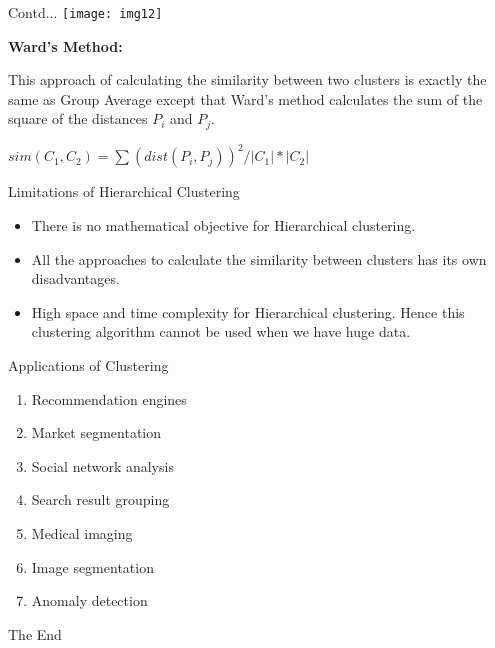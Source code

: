 \documentclass{beamer}
\newcommand\myheading[1]{%
  \par\bigskip
  {\large\bfseries#1}\par\smallskip}
\begin{document}
\begin{frame}{Contd...}
	\texttt{[image: img12]}
	\begin{flushleft}
		\myheading{Ward’s Method:}
		This approach of calculating the similarity between two clusters is exactly the same as Group Average except that Ward’s method calculates the sum of the square of the distances $P_i$ and $P_j$.
		\end{flushleft}
		$sim(C_1, C_2) = \sum (dist(P_i, P_j))^2/|C_1|*|C_2|$ \\
\end{frame}

\begin{frame}{Limitations of Hierarchical Clustering}
	\begin{itemize}
		\item There is no mathematical objective for Hierarchical clustering.
		\item All the approaches to calculate the similarity between clusters has its own disadvantages.
		\item High space and time complexity for Hierarchical clustering. Hence this clustering algorithm cannot be used when we have huge data.
	\end{itemize}
\end{frame}

\begin{frame}{Applications of Clustering}
	\begin{enumerate}
		\item Recommendation engines
		\item Market segmentation
		\item Social network analysis
		\item Search result grouping
		\item Medical imaging
		\item Image segmentation
		\item Anomaly detection
	\end{enumerate}
\end{frame}

\begin{frame}
\huge{\centerline{The End}}
\end{frame}
\end{document}
